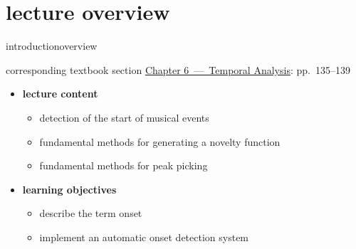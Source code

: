 




\subtitle{Module 6.1: Onset Detection}


	

    \section[overview]{lecture overview}
        \begin{frame}{introduction}{overview}
            \begin{block}{corresponding textbook section}
                    \href{http://ieeexplore.ieee.org/xpl/articleDetails.jsp?arnumber=6331123}{Chapter 6~---~Temporal Analysis}: pp.~135--139
            \end{block}

            \begin{itemize}
                \item   \textbf{lecture content}
                    \begin{itemize}
                        \item   detection of the start of musical events
                        \item   fundamental methods for generating a novelty function
                        \item   fundamental methods for peak picking
                    \end{itemize}
                \bigskip
                \item<2->   \textbf{learning objectives}
                    \begin{itemize}
                        \item   describe the term onset
                        \item   implement an automatic onset detection system
                    \end{itemize}
            \end{itemize}
        \end{frame}

